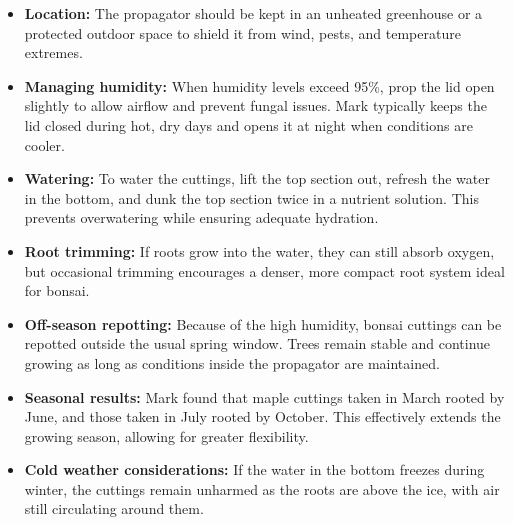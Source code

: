 \begin{itemize}
    \item \textbf{Location:} The propagator should be kept in an unheated greenhouse or a protected outdoor space to shield it from wind, pests, and temperature extremes.

    \item \textbf{Managing humidity:} When humidity levels exceed 95\%, prop the lid open slightly to allow airflow and prevent fungal issues.
    Mark typically keeps the lid closed during hot, dry days and opens it at night when conditions are cooler.

    \item \textbf{Watering:} To water the cuttings, lift the top section out, refresh the water in the bottom, and dunk the top section twice in a nutrient solution.
    This prevents overwatering while ensuring adequate hydration.

    \item \textbf{Root trimming:} If roots grow into the water, they can still absorb oxygen, but occasional trimming encourages a denser, more compact root system ideal for bonsai.

    \item \textbf{Off\--season repotting:} Because of the high humidity, bonsai cuttings can be repotted outside the usual spring window.
    Trees remain stable and continue growing as long as conditions inside the propagator are maintained.

    \item \textbf{Seasonal results:} Mark found that maple cuttings taken in March rooted by June, and those taken in July rooted by October.
    This effectively extends the growing season, allowing for greater flexibility.

    \item \textbf{Cold weather considerations:} If the water in the bottom freezes during winter, the cuttings remain unharmed as the roots are above the ice, with air still circulating around them.
\end{itemize}

\medskip

